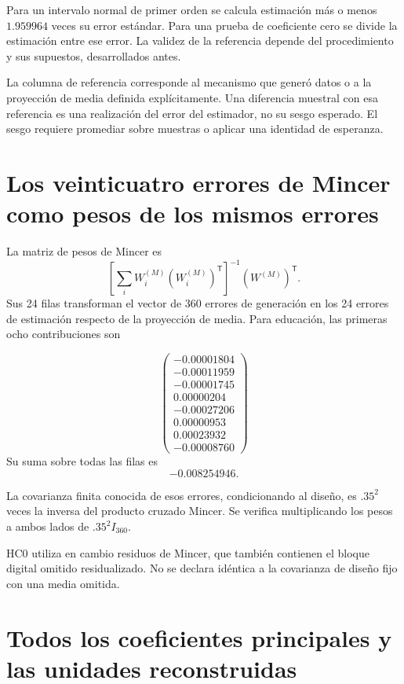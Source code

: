\documentclass[11pt,a4paper]{article}
\begin{document}
Para un intervalo normal de primer orden se calcula estimación más o menos $1.959964$ veces su error estándar. Para una prueba de coeficiente cero se divide la estimación entre ese error. La validez de la referencia depende del procedimiento y sus supuestos, desarrollados antes.

La columna de referencia corresponde al mecanismo que generó datos o a la proyección de media definida explícitamente. Una diferencia muestral con esa referencia es una realización del error del estimador, no su sesgo esperado. El sesgo requiere promediar sobre muestras o aplicar una identidad de esperanza.

\clearpage
\section{Los veinticuatro errores de Mincer como pesos de los mismos errores}

La matriz de pesos de Mincer es
\[
\left[\sum_iW_i^{(M)}(W_i^{(M)})^{\mathsf T}\right]^{-1}
(W^{(M)})^{\mathsf T}.
\]
Sus 24 filas transforman el vector de 360 errores de generación en los 24 errores de estimación respecto de la proyección de media. Para educación, las primeras ocho contribuciones son

\[
\begin{pmatrix}-0.00001804\\-0.00011959\\-0.00001745\\0.00000204\\-0.00027206\\0.00000953\\0.00023932\\-0.00008760\end{pmatrix}
\]
Su suma sobre todas las filas es
\[
-0.008254946.
\]

La covarianza finita conocida de esos errores, condicionando al diseño, es $.35^2$ veces la inversa del producto cruzado Mincer. Se verifica multiplicando los pesos a ambos lados de $.35^2I_{360}$.

HC0 utiliza en cambio residuos de Mincer, que también contienen el bloque digital omitido residualizado. No se declara idéntica a la covarianza de diseño fijo con una media omitida.

\clearpage
\section{Todos los coeficientes principales y las unidades reconstruidas}
\end{document}
